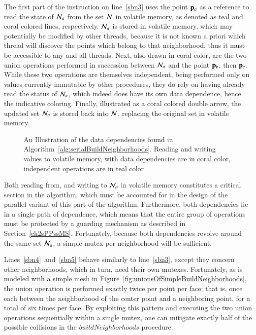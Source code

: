 The first part of the instruction on line~\ref{sbn3} uses the point $\mathbf{p}_a$ as a reference to read the state of $\mathcal{N}_a$ from the set $\mathcal{N}$ in volatile memory, as denoted as teal and coral colored lines, respectively. $\mathcal{N}_a$ is stored in volatile memory, which may potentially be modified by other threads, because it is not known a priori which thread will discover the points which belong to that neighborhood, thus it must be accessible to any and all threads. Next, also drawn in coral color, are the two union operations performed in succession between $\mathcal{N}_a$ and the point $\mathbf{p}_b$, then $\mathbf{p}_c$. While these two operations are themselves independent, being performed only on values currently immutable by other procedures, they do rely on having already read the status of $\mathcal{N}_a$, which indeed does have its own data dependence, hence the indicative coloring. Finally, illustrated as a coral colored double arrow, the updated set $\mathcal{N}_a$ is stored back into $\mathcal{N}$, replacing the original set in volatile memory.

\begin{figure}[ht]
	
	{\caption[Data Dependencies in Serial Algorithm~\ref{alg:serialBuildNeighborhoods}: Build Neighborhoods]{An Illustration of the data dependencies found in Algorithm~\ref{alg:serialBuildNeighborhoods}. Reading and writing values to volatile memory,  with data dependencies are in coral color, independent operations are in teal color}\label{fig:sabnDataDependencies}}
\end{figure}

Both reading from, and writing to $\mathcal{N}_a$ in volatile memory constitutes a critical section in the algorithm, which must be accounted for in the design of the parallel variant of this part of the algorithm. Furthermore, both dependencies lie in a single path of dependence, which means that the entire group of operations must be protected by a guarding mechanism as described in Section~\ref{ch2sPPssMS}. Fortunately, because both dependencies revolve around the same set $\mathcal{N}_a$, a simple mutex per neighborhood will be sufficient.

Lines~\ref{sbn4}~and~\ref{sbn5} behave similarly to line~\ref{sbn3}, except they concern other neighborhoods, which in turn, need their own mutexes. Fortunately, as is modeled with a simple mesh in Figure~\ref{fig:unionsOfSimpleBuildNeighborhoods}, the union operation is performed exactly twice per point per face; that is, once each between the neighborhood of the center point and a neighboring point, for a total of six times per face. By exploiting this pattern and executing the two union operations sequentially within a single mutex, one can mitigate exactly half of the possible collisions in the $\mathit{buildNeighborhoods}$ procedure.

